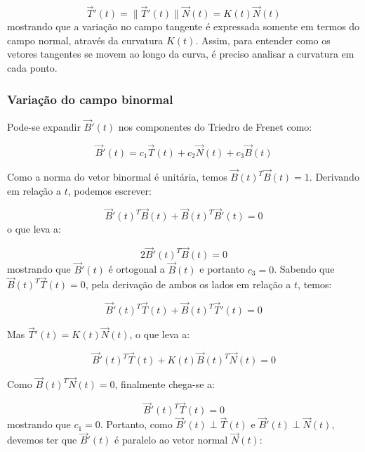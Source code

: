 \documentclass[a4paper,12pt]{article}
\begin{document}
\begin{equation}
	\vec{T}'(t) = \lVert \vec{T}'(t) \rVert \vec{N}(t) = K(t) \vec{N}(t)
\end{equation} mostrando que a variação no campo tangente é expressada somente em termos do campo normal, através da curvatura $K(t)$. Assim, para entender como os vetores tangentes se movem ao longo da curva, é preciso analisar a curvatura em cada ponto.

\subsubsection*{Variação do campo binormal}

Pode-se expandir $\vec{B}'(t)$ nos componentes do Triedro de Frenet como:

\begin{equation}
	\vec{B}'(t) = c_1 \vec{T}(t) + c_2 \vec{N}(t) + c_3 \vec{B}(t)
\end{equation}

Como a norma do vetor binormal é unitária, temos $\vec{B}(t)^T \vec{B}(t) = 1$. Derivando em relação a $t$, podemos escrever:

\begin{equation}
	\vec{B}'(t)^T \vec{B}(t) + \vec{B}(t)^T \vec{B}'(t) = 0
\end{equation} o que leva a:

\begin{equation}
	2 \vec{B}'(t)^T \vec{B}(t) = 0
\end{equation} mostrando que $\vec{B}'(t)$ é ortogonal a $\vec{B}(t)$ e portanto $c_3 = 0$. Sabendo que $\vec{B}(t)^T \vec{T}(t) = 0$, pela derivação de ambos os lados em relação a $t$, temos:

\begin{equation}
	\vec{B}'(t)^T \vec{T}(t) + \vec{B}(t)^T \vec{T}'(t) = 0
\end{equation} 

Mas $\vec{T}'(t) = K(t) \vec{N}(t)$, o que leva a:

\begin{equation}
	\vec{B}'(t)^T \vec{T}(t) + K(t)\vec{B}(t)^T \vec{N}(t) = 0
\end{equation} 

Como $\vec{B}(t)^T \vec{N}(t) = 0$, finalmente chega-se a:

\begin{equation}
	\vec{B}'(t)^T \vec{T}(t) = 0
\end{equation} mostrando que $c_1 = 0$. Portanto, como $\vec{B}'(t) \perp \vec{T}(t)$ e $\vec{B}'(t) \perp \vec{N}(t)$, devemos ter que $\vec{B}'(t)$ é paralelo ao vetor normal $\vec{N}(t)$:
\end{document}
